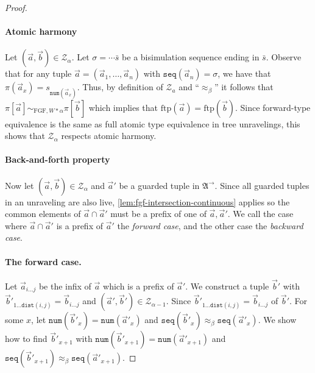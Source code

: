 \documentclass[draft]{scrartcl}
\theoremstyle{definition}
\newcommand{\str}[1]{\mathfrak{#1}}
\newcommand{\seq}[1]{\mathtt{seq}({#1})}
\newcommand{\num}[1]{\mathtt{num}({#1})}
\newcommand{\dist}[2]{\mathtt{dist}({#1},{#2})}
\newcommand{\sij}{_{i\ldots{}j}}
\begin{document}
\begin{proof}
  \paragraph{Atomic harmony}
  Let $(\overrightarrow{a}, \overrightarrow{b}) \in \mathcal{Z}_{\alpha}$.
  Let $\sigma = \cdots{}\bar{s}$ be a bisimulation sequence ending in $\bar{s}$.
  Observe that for any tuple $\overrightarrow{a} = (\overrightarrow{a}_{1}, \ldots{}, \overrightarrow{a}_{n})$ with $\seq{\overrightarrow{a}_{n}} = \sigma$, we have that $\pi(\overrightarrow{a}_{x}) = s_{\num{\overrightarrow{a}_{x}}}$.
  Thus, by definition of $\mathcal{Z}_{a}$ and ``$\approx_{\beta}$'' it follows that $\pi[\overrightarrow{a}] \sim_{\mathrm{FGF},W*\alpha} \pi[\overrightarrow{b}]$ which implies that $\mathrm{ftp}(\overrightarrow{a}) = \mathrm{ftp}(\overrightarrow{b})$.
  Since forward-type equivalence is the same as full atomic type equivalence in tree unravelings, this shows that $\mathcal{Z}_{\alpha}$ respects atomic harmony.

  \paragraph{Back-and-forth property}
  Now let $(\overrightarrow{a}, \overrightarrow{b}) \in \mathcal{Z}_{\alpha}$ and $\overrightarrow{a}'$ be a guarded tuple in $\str{A}^{\rightarrow}$.
  Since all guarded tuples in an unraveling are also live, \cref{lem:fgf-intersection-continuous} applies so the common elements of $\overrightarrow{a} \cap \overrightarrow{a}'$ must be a prefix of one of $\overrightarrow{a}, \overrightarrow{a}'$.
  We call the case where $\overrightarrow{a} \cap \overrightarrow{a}'$ is a prefix of $\overrightarrow{a}'$ the \emph{forward case}, and the other case the \emph{backward case}.

  \paragraph{The forward case.}
  Let $\overrightarrow{a}\sij$ be the infix of $\overrightarrow{a}$ which is a prefix of $\overrightarrow{a}'$.
  We construct a tuple $\overrightarrow{b}'$ with $\overrightarrow{b}'_{1\ldots{}\dist{i}{j}} = \overrightarrow{b}\sij$ and $(\overrightarrow{a}', \overrightarrow{b}') \in \mathcal{Z}_{\alpha-1}$.
  Since $\overrightarrow{b}'_{1\ldots{}\dist{i}{j}} = \overrightarrow{b}\sij$  of $\overrightarrow{b}'$.
  For some $x$, let $\num{\overrightarrow{b}'_{x}} = \num{\overrightarrow{a}'_{x}}$ and $\seq{\overrightarrow{b}'_{x}} \approx_{\beta} \seq{\overrightarrow{a}'_{x}}$.
  We show how to find $\overrightarrow{b}'_{x+1}$ with $\num{\overrightarrow{b}'_{x+1}} = \num{\overrightarrow{a}'_{x+1}}$ and $\seq{\overrightarrow{b}'_{x+1}} \approx_{\beta} \seq{\overrightarrow{a}'_{x+1}}$.


\end{proof}
\end{document}
